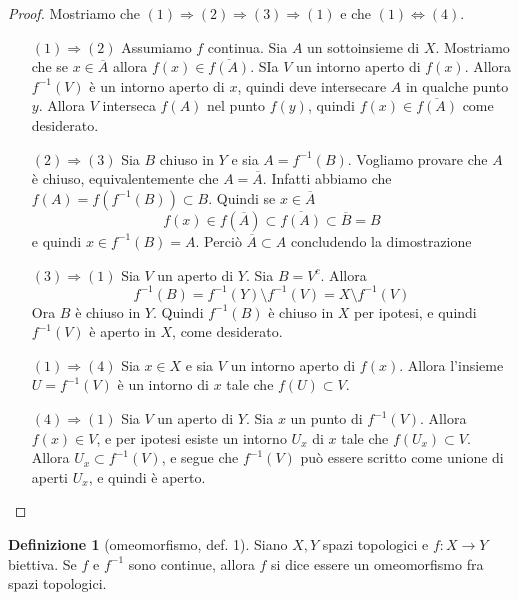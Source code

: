 \documentclass[10pt,a4paper]{article}
\theoremstyle{definition}
\newtheorem{defi}{Definizione}
\theoremstyle{plain}
\theoremstyle{remark}
\theoremstyle{remark}
\begin{document}
\begin{proof} Mostriamo che $(1) \Rightarrow (2) \Rightarrow (3) \Rightarrow
(1)$ e che $ (1) \Leftrightarrow (4)$.
\begin{itemize}
\item[$(1) \Rightarrow (2)$] Assumiamo $f$ continua. Sia $A$ un sottoinsieme di
$X$. Mostriamo che se $x \in \overline{A}$ allora $f(x) \in
\overline{f(A)}$. SIa $V$ un intorno aperto di $f(x)$. Allora $f^{-1}(V)$ è un
intorno aperto di $x$, quindi deve intersecare $A$ in qualche punto $y$. Allora
$V$ interseca $f(A)$ nel punto $f(y)$, quindi $f(x) \in \overline{f(A)}$ come
desiderato.
\item[$(2) \Rightarrow (3)$] Sia $B$ chiuso in $Y$ e sia $A =
f^{-1}(B)$. Vogliamo provare che $A$ è chiuso, equivalentemente che $A =
\overline{A}$. Infatti abbiamo che $f(A)= f\left( f^{-1}(B) \right) \subset
B$. Quindi se $x \in \overline{A}$ \[ f(x) \in f(\overline{A}) \subset
\overline{f(A)} \subset \overline{B} = B \] e quindi $x \in f^{-1}(B)=A$. Perciò
$\overline{A} \subset A$ concludendo la dimostrazione
\item[$(3) \Rightarrow (1)$] Sia $V$ un aperto di $Y$. Sia $B = V^c$. Allora \[
f^{-1}(B) = f^{-1}(Y) \setminus f^{-1}(V) = X \setminus f^{-1}(V) \] Ora $B$ è
chiuso in $Y$. Quindi $f^{-1}(B)$ è chiuso in $X$ per ipotesi, e quindi
$f^{-1}(V)$ è aperto in $X$, come desiderato.
\item[$(1) \Rightarrow (4)$] Sia $x \in X$ e sia $V $ un intorno aperto di
$f(x)$. Allora l'insieme $U = f^{-1}(V)$ è un intorno di $x$ tale che $f(U)
\subset V$.
\item[$(4) \Rightarrow (1)$] Sia $V$ un aperto di $Y$. Sia $x$ un punto di
$f^{-1}(V)$. Allora $f(x) \in V$, e per ipotesi esiste un intorno $U_x$ di $x$
tale che $f(U_x) \subset V$. Allora $U_x \subset f^{-1}(V)$, e segue che
$f^{-1}(V)$ può essere scritto come unione di aperti $U_x$, e quindi è aperto.
\end{itemize}
\end{proof}



\begin{defi}[omeomorfismo, def. 1] Siano $X,Y$ spazi topologici e $f: X \to Y$
biettiva. Se $f$ e $f^{-1}$ sono continue, allora $f$ si dice essere un
omeomorfismo fra spazi topologici.
\end{defi}

\end{document}
